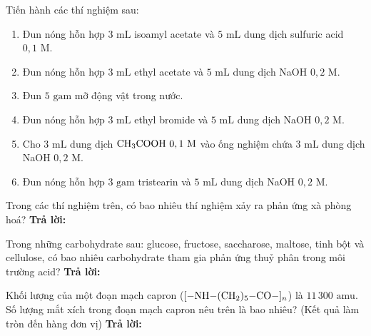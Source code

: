 \documentclass[11pt,a4paper]{article}
\begin{document}
\begin{ex}
Tiến hành các thí nghiệm sau:
\begin{enumerate}[label=(\arabic*),leftmargin=20pt,itemsep=1pt]
\item Đun nóng hỗn hợp $3\text{ mL}$ isoamyl acetate và $5\text{ mL}$ dung dịch sulfuric acid $0,1\text{ M}$.
\item Đun nóng hỗn hợp $3\text{ mL}$ ethyl acetate và $5\text{ mL}$ dung dịch NaOH $0,2\text{ M}$.
\item Đun $5\text{ gam}$ mỡ động vật trong nước.
\item Đun nóng hỗn hợp $3\text{ mL}$ ethyl bromide và $5\text{ mL}$ dung dịch NaOH $0,2\text{ M}$.
\item Cho $3\text{ mL}$ dung dịch $\ce{CH3COOH}\ 0,1\text{ M}$ vào ống nghiệm chứa $3\text{ mL}$ dung dịch NaOH $0,2\text{ M}$.
\item Đun nóng hỗn hợp $3\text{ gam}$ tristearin và $5\text{ mL}$ dung dịch NaOH $0,2\text{ M}$.
\end{enumerate}
Trong các thí nghiệm trên, có bao nhiêu thí nghiệm xảy ra phản ứng xà phòng hoá?
\hfill \textbf{Trả lời:} \dotfill

\end{ex}
\begin{ex}
Trong những carbohydrate sau: glucose, fructose, saccharose, maltose, tinh bột và cellulose, có bao nhiêu carbohydrate tham gia phản ứng thuỷ phân trong môi trường acid?
\hfill \textbf{Trả lời:} \dotfill

\end{ex}
\begin{ex}
Khối lượng của một đoạn mạch capron ($\ce{[-NH-(CH2)5-CO-]_n}$) là $11\,300\text{ amu}$. Số lượng mắt xích trong đoạn mạch capron nêu trên là bao nhiêu? (Kết quả làm tròn đến hàng đơn vị)
\hfill \textbf{Trả lời:} \dotfill

\end{ex}
\end{document}
